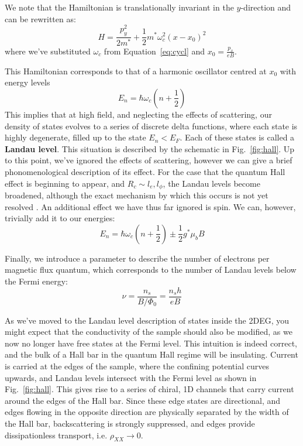 We note that the Hamiltonian is translationally invariant in the $y$-direction and can be rewritten as:
\begin{equation}
  H = \frac{p_y^2}{2m^*} + \frac{1}{2}m^*\omega_c^2(x - x_0)^2
\end{equation}
where we've substituted $\omega_c$ from Equation~\ref{eq:cycl} and $x_0 = \tfrac{p_x}{eB}$.

This Hamiltonian corresponds to that of a harmonic oscillator centred at $x_0$ with energy levels
\begin{equation}
  E_n = \hbar \omega_c\left(n + \frac{1}{2}\right)
\end{equation}
This implies that at high field, and neglecting the effects of scattering, our density of states evolves to
a series of discrete delta functions, where each state is highly degenerate, filled up to the state $E_n < E_F$.
Each of these states is called a \textbf{Landau level}. This situation is described by the schematic in Fig.~\ref{fig:hall}.
Up to this point, we've ignored the effects of scattering, however we can give a brief phonomenological description of its effect.
For the case that the quantum Hall effect is beginning to appear, and $R_c \sim l_e, l_\phi$, the Landau levels become broadened, although the exact mechanism
by which this occurs is not yet resolved \cite{PhysRevB.90.035425, PhysRevB.82.075401}. An additional effect we have thus far ignored is spin.
We can, however, trivially add it to our energies:
\begin{equation}
  E_n = \hbar \omega_c\left(n + \frac{1}{2}\right) \pm \frac{1}{2}g^* \mu_b B
\end{equation}

Finally, we introduce a parameter to describe the number of electrons per magnetic flux quantum, which corresponds
to the number of Landau levels below the Fermi energy:
\begin{equation}
  \nu = \frac{n_s}{B / \Phi_0} = \frac{n_s h}{e B}
  \label{eq:nu}
\end{equation}

As we've moved to the Landau level description of states inside the 2DEG, you might expect that the conductivity of the sample should also
be modified, as we now no longer have free states at the Fermi level. This intuition is indeed correct, and the bulk of a Hall bar in the quantum
Hall regime will be insulating. Current is carried at the edges of the sample, where the confining potential curves upwards, and Landau levels
intersect with the Fermi level \cite{PhysRevB.25.2185} as shown in Fig.~\ref{fig:hall}. This gives rise to a series of chiral, 1D channels that carry current around the edges
of the Hall bar. Since these edge states are directional, and edges flowing in the opposite direction are physically separated by the width of the Hall
bar, backscattering is strongly suppressed, and edges provide dissipationless transport, i.e. $\rho_{XX} \rightarrow 0$.

